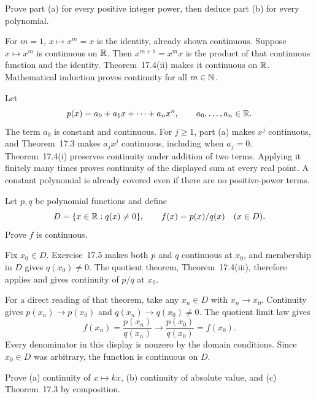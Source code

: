 \goal Prove part (a) for every positive integer power, then
deduce part (b) for every polynomial.

For $m=1$, $x\mapsto x^m=x$ is the identity, already shown
continuous. Suppose $x\mapsto x^m$ is continuous on $\mathbb{R}$.
Then $x^{m+1}=x^m x$ is the product of that continuous function
and the identity. Theorem~17.4(ii) makes it continuous on $\mathbb{R}$.
Mathematical induction proves continuity for all $m\in\mathbb{N}$.

Let
\[
 p(x)=a_0+a_1x+\cdots+a_nx^n,
 \qquad a_0,\ldots,a_n\in\mathbb{R}.
\]
The term $a_0$ is constant and continuous. For $j\ge1$,
part (a) makes $x^j$ continuous, and Theorem~17.3 makes
$a_jx^j$ continuous, including when $a_j=0$.
Theorem~17.4(i) preserves continuity under addition of two
terms. Applying it finitely many times proves continuity of
the displayed sum at every real point. A constant polynomial
is already covered even if there are no positive-power terms.

\goal Let $p,q$ be polynomial functions and define
\[
 D=\{x\in\mathbb{R}:q(x)\ne0\},\qquad f(x)=p(x)/q(x)\quad(x\in D).
\]
Prove $f$ is continuous.

Fix $x_0\in D$. Exercise~17.5 makes both $p$ and $q$
continuous at $x_0$, and membership in $D$ gives $q(x_0)\ne0$.
The quotient theorem, Theorem~17.4(iii), therefore applies and
gives continuity of $p/q$ at $x_0$.

For a direct reading of that theorem, take any $x_n\in D$
with $x_n\to x_0$. Continuity gives $p(x_n)\to p(x_0)$
and $q(x_n)\to q(x_0)\ne0$. The quotient limit law gives
\[
 f(x_n)=\frac{p(x_n)}{q(x_n)}\longrightarrow
 \frac{p(x_0)}{q(x_0)}=f(x_0).
\]
Every denominator in this display is nonzero by the domain
conditions. Since $x_0\in D$ was arbitrary, the function is
continuous on $D$.

\goal Prove (a) continuity of $x\mapsto kx$, (b) continuity of
absolute value, and (c) Theorem~17.3 by composition.


